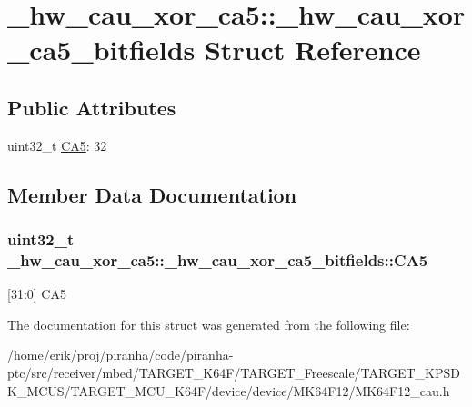 \hypertarget{struct__hw__cau__xor__ca5_1_1__hw__cau__xor__ca5__bitfields}{}\section{\+\_\+hw\+\_\+cau\+\_\+xor\+\_\+ca5\+:\+:\+\_\+hw\+\_\+cau\+\_\+xor\+\_\+ca5\+\_\+bitfields Struct Reference}
\label{struct__hw__cau__xor__ca5_1_1__hw__cau__xor__ca5__bitfields}
\subsection*{Public Attributes}
\begin{DoxyCompactItemize}
\item 
uint32\+\_\+t \hyperlink{struct__hw__cau__xor__ca5_1_1__hw__cau__xor__ca5__bitfields_a48944df183bde99652aed0258016cecd}{C\+A5}\+: 32
\end{DoxyCompactItemize}


\subsection{Member Data Documentation}
\subsubsection[{\texorpdfstring{C\+A5}{CA5}}]{\setlength{\rightskip}{0pt plus 5cm}uint32\+\_\+t \+\_\+hw\+\_\+cau\+\_\+xor\+\_\+ca5\+::\+\_\+hw\+\_\+cau\+\_\+xor\+\_\+ca5\+\_\+bitfields\+::\+C\+A5}\hypertarget{struct__hw__cau__xor__ca5_1_1__hw__cau__xor__ca5__bitfields_a48944df183bde99652aed0258016cecd}{}\label{struct__hw__cau__xor__ca5_1_1__hw__cau__xor__ca5__bitfields_a48944df183bde99652aed0258016cecd}
\mbox{[}31\+:0\mbox{]} C\+A5 

The documentation for this struct was generated from the following file\+:\begin{DoxyCompactItemize}
\item 
/home/erik/proj/piranha/code/piranha-\/ptc/src/receiver/mbed/\+T\+A\+R\+G\+E\+T\+\_\+\+K64\+F/\+T\+A\+R\+G\+E\+T\+\_\+\+Freescale/\+T\+A\+R\+G\+E\+T\+\_\+\+K\+P\+S\+D\+K\+\_\+\+M\+C\+U\+S/\+T\+A\+R\+G\+E\+T\+\_\+\+M\+C\+U\+\_\+\+K64\+F/device/device/\+M\+K64\+F12/M\+K64\+F12\+\_\+cau.\+h\end{DoxyCompactItemize}
